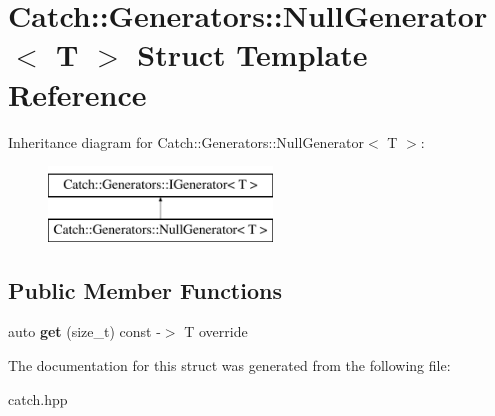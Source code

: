 \hypertarget{struct_catch_1_1_generators_1_1_null_generator}{}\section{Catch\+:\+:Generators\+:\+:Null\+Generator$<$ T $>$ Struct Template Reference}
\label{struct_catch_1_1_generators_1_1_null_generator}
Inheritance diagram for Catch\+:\+:Generators\+:\+:Null\+Generator$<$ T $>$\+:\begin{figure}[H]
\begin{center}
\leavevmode
\includegraphics[height=2.000000cm]{struct_catch_1_1_generators_1_1_null_generator}
\end{center}
\end{figure}
\subsection*{Public Member Functions}
\begin{DoxyCompactItemize}
\item 
\mbox{\label{struct_catch_1_1_generators_1_1_null_generator_a17a2cc82d644e97afded4017c7a062ef}} 
auto {\bfseries get} (size\+\_\+t) const -\/$>$ T override
\end{DoxyCompactItemize}


The documentation for this struct was generated from the following file\+:\begin{DoxyCompactItemize}
\item 
catch.\+hpp\end{DoxyCompactItemize}
